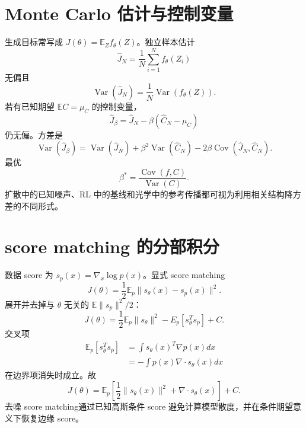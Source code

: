 \documentclass[11pt]{article}
\numberwithin{equation}{section}
\newcommand{\E}{\mathbb{E}}
\newcommand{\1}{\mathbf{1}}
\newcommand{\Var}{\operatorname{Var}}
\newcommand{\Cov}{\operatorname{Cov}}
\begin{document}
\section{Monte Carlo 估计与控制变量}

生成目标常写成 $J(\theta)=\E_Z f_\theta(Z)$。独立样本估计
\begin{equation}
 \widehat J_N=\frac1N\sum_{i=1}^{N}f_\theta(Z_i)
\end{equation}
无偏且
\begin{equation}
 \Var(\widehat J_N)=\frac1N\Var(f_\theta(Z)).
\end{equation}
若有已知期望 $\E C=\mu_C$ 的控制变量，
\begin{equation}
 \widehat J_\beta=\widehat J_N-\beta(\widehat C_N-\mu_C)
\end{equation}
仍无偏。方差是
\begin{equation}
 \Var(\widehat J_\beta)
 =\Var(\widehat J_N)+\beta^2\Var(\widehat C_N)
 -2\beta\Cov(\widehat J_N,\widehat C_N).
\end{equation}
最优
\begin{equation}
 \beta^*=\frac{\Cov(f,C)}{\Var(C)}.
\end{equation}
扩散中的已知噪声、RL 中的基线和光学中的参考传播都可视为利用相关结构降方差的不同形式。

\section{score matching 的分部积分}

数据 score 为 $s_p(x)=\nabla_x\log p(x)$。显式 score matching
\begin{equation}
 J(\theta)=\frac12\E_p\|s_\theta(x)-s_p(x)\|^2.
\end{equation}
展开并去掉与 $\theta$ 无关的 $\E\|s_p\|^2/2$：
\begin{equation}
 J(\theta)=\frac12\E_p\|s_\theta\|^2-E_p[s_\theta^Ts_p]+C.
\end{equation}
交叉项
\begin{align}
 \E_p[s_\theta^Ts_p]
 &=\int s_\theta(x)^T\nabla p(x)dx\\
 &=-\int p(x)\nabla\cdot s_\theta(x)dx
\end{align}
在边界项消失时成立。故
\begin{equation}
 J(\theta)=\E_p\left[
 \frac12\|s_\theta(x)\|^2+\nabla\cdot s_\theta(x)
 \right]+C.
\end{equation}
去噪 score matching通过已知高斯条件 score 避免计算模型散度，并在条件期望意义下恢复边缘 score。
\end{document}
